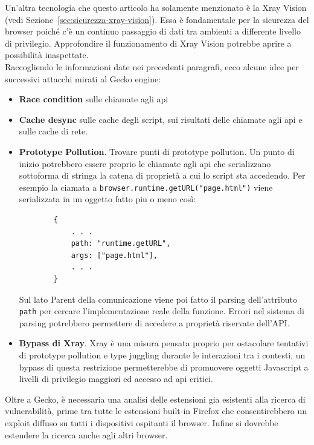 \documentclass{sapthesis}
\newcommand{\bold}[1]{\textbf{#1}}
\newcommand{\code}[1]{\texttt{#1}}
\newcommand{\refSection}[1]{Sezione~\ref{#1}}
\newcommand{\JS}{Javascript}
\begin{document}
    Un'altra tecnologia che questo articolo ha solamente menzionato è la Xray Vision (vedi \refSection{sec:sicurezza-xray-vision}).
    Essa è fondamentale per la sicurezza del browser poiché c'è un continuo passaggio di dati
    tra ambienti a differente livello di privilegio. Approfondire il funzionamento di Xray Vision
    potrebbe aprire a possibilità inaspettate.\\
    
    Raccogliendo le informazioni date nei precedenti paragrafi, ecco alcune idee per successivi
    attacchi mirati al Gecko engine:
    \begin{itemize}
        \item \bold{Race condition} sulle chiamate agli api
        \item \bold{Cache desync} sulle cache degli script, sui risultati delle chiamate agli api e sulle cache di rete.
        \item \bold{Prototype Pollution}. Trovare punti di prototype pollution. Un punto di inizio 
                potrebbero essere proprio le chiamate agli api che serializzano sottoforma di stringa
                la catena di proprietà a cui lo script sta accedendo. Per esempio la ciamata a
                \code{browser.runtime.getURL("page.html")} viene serializzata in un oggetto fatto piu o meno così:
                \begin{lstlisting}
        {
            . . .
            path: "runtime.getURL",
            args: ["page.html"],
            . . .
        }
                \end{lstlisting}
                Sul lato Parent della comunicazione viene poi fatto il parsing dell'attributo \code{path}
                per cercare l'implementazione reale della funzione. Errori nel sistema di parsing potrebbero
                permettere di accedere a proprietà riservate dell'API.

        \item \bold{Bypass di Xray}. Xray è una misura pensata proprio per ostacolare tentativi di
                prototype pollution e type juggling durante le interazioni tra i contesti, un bypass di
                questa restrizione permetterebbe di promuovere oggetti \JS{} a livelli di privilegio
                maggiori ed accesso ad api critici.
    \end{itemize}

    Oltre a Gecko, è necessaria una analisi delle estensioni gia esistenti alla ricerca di vulnerabilità,
    prime tra tutte le estensioni built-in Firefox che consentirebbero un exploit diffuso su tutti i
    dispositivi ospitanti il browser.
    Infine si dovrebbe estendere la ricerca anche agli altri browser.

\printbibliography
\end{document}
